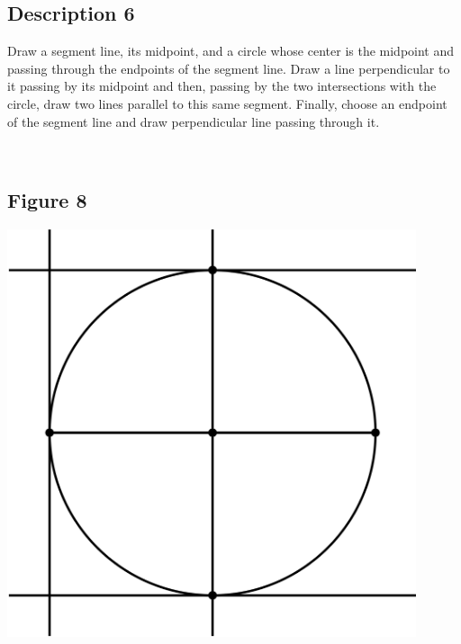 \documentclass[12pt,a4paper,article,english,firamath]{nsi}
\begin{document}
\maketitle

\subsection*{Description 6}
{\brettley 

Draw a segment line, its midpoint, and a circle whose center is the midpoint and passing through the endpoints of the segment line. Draw a line perpendicular to it passing by its midpoint and then, passing by the two intersections with the circle, draw two lines parallel to this same segment. Finally, choose an endpoint of the segment line and draw perpendicular line passing through it.}\\[1em]



\subsection*{Figure 8}
\begin{center}
    \includegraphics[height=12cm]{img/fig06.png}
\end{center}
\end{document}
